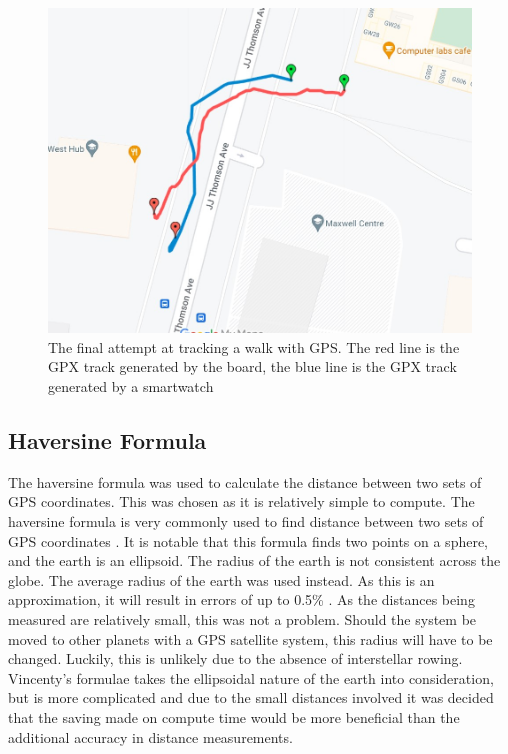 \documentclass[12pt,a4paper]{report}
\begin{document}
\begin{figure} [h]
\begin{center}
\includegraphics[scale=0.4]{gps2.jpg}
\end{center}
\caption{The final attempt at tracking a walk with GPS. The red line is the GPX track generated by the board, the blue line is the GPX track generated by a smartwatch \cite{googlemapsgeneral}}
\end{figure}
\FloatBarrier

\subsection{Haversine Formula}
The haversine formula was used to calculate the distance between two sets of GPS coordinates. This was chosen as it is relatively simple to compute. The haversine formula is very commonly used to find distance between two sets of GPS coordinates \cite{haversine}. It is notable that this formula finds two points on a sphere, and the earth is an ellipsoid. The radius of the earth is not consistent across the globe. The average radius of the earth was used instead. As this is an approximation, it will result in errors of up to 0.5\% \cite{gps}. As the distances being measured are relatively small, this was not a problem. Should the system be moved to other planets with a GPS satellite system, this radius will have to be changed. Luckily, this is unlikely due to the absence of interstellar rowing. \\ %
Vincenty's formulae takes the ellipsoidal nature of the earth into consideration, but is more complicated and due to the small distances involved it was decided that the saving made on compute time would be more beneficial than the additional accuracy in distance measurements. \\
\end{document}
